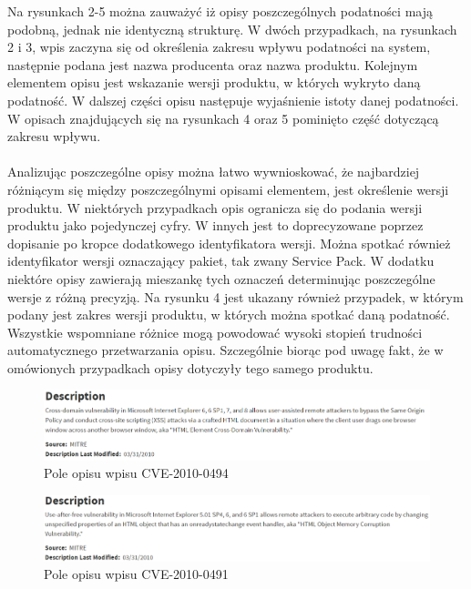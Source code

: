 \documentclass[a4paper,12pt,twoside]{article}
\begin{document}
Na rysunkach 2-5 można zauważyć iż opisy poszczególnych podatności mają podobną, jednak nie identyczną strukturę. W dwóch przypadkach, na rysunkach 2 i 3, wpis zaczyna się od określenia zakresu wpływu podatności na system, następnie podana jest nazwa producenta oraz nazwa produktu. Kolejnym elementem opisu jest wskazanie wersji produktu, w których wykryto daną podatność. W dalszej części opisu następuje wyjaśnienie istoty danej podatności. W opisach znajdujących się na rysunkach 4 oraz 5 pominięto część dotyczącą zakresu wpływu. 

\paragraph{}
Analizując poszczególne opisy można łatwo wywnioskować, że najbardziej różniącym się między poszczególnymi opisami elementem, jest określenie wersji produktu. W niektórych przypadkach opis ogranicza się do podania wersji produktu jako pojedynczej cyfry. W innych jest to doprecyzowane poprzez dopisanie po kropce dodatkowego identyfikatora wersji. Można spotkać również identyfikator wersji oznaczający pakiet, tak zwany Service Pack. W dodatku niektóre opisy zawierają mieszankę tych oznaczeń determinując poszczególne wersje z różną precyzją. Na rysunku 4 jest ukazany również przypadek, w którym podany jest zakres wersji produktu, w których można spotkać daną podatność. Wszystkie wspomniane różnice mogą powodować wysoki stopień trudności automatycznego przetwarzania opisu. Szczególnie biorąc pod uwagę fakt, że w omówionych przypadkach opisy dotyczyły tego samego produktu.

\begin{figure}
    \centering
    \includegraphics[width=1.0\textwidth]{image/002CVE20100494.png}
    \caption{Pole opisu wpisu CVE-2010-0494}
    \label{fig:Rysunek 2}
\end{figure}

\begin{figure}
    \centering
    \includegraphics[width=1.0\textwidth]{image/003CVE20100491.png}
    \caption{Pole opisu wpisu CVE-2010-0491}
    \label{fig:Rysunek 3}
\end{figure}
\end{document}
